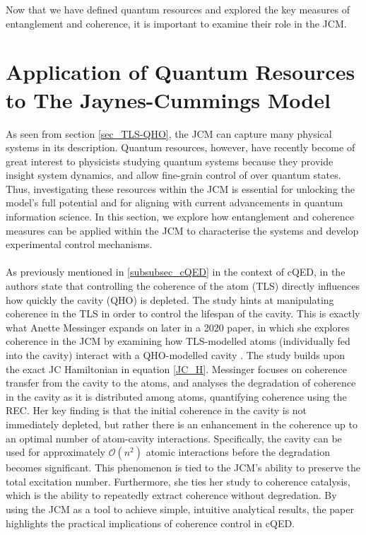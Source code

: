 \documentclass[12pt,a4paper]{article}
\begin{document}
Now that we have defined quantum resources and explored the key measures of entanglement and coherence, it is important to examine their role in the JCM.


\section{Application of Quantum Resources to The Jaynes-Cummings Model} \label{sec_QRes_app}

As seen from section \ref{sec_TLS-QHO}, the JCM can capture many physical systems in its description. Quantum resources, however, have recently become of great interest to physicists studying quantum systems because they provide insight system dynamics, and allow fine-grain control of over quantum states. Thus, investigating these resources within the JCM is essential for unlocking the model's full potential and for aligning with current advancements in quantum information science. In this section, we explore how entanglement and coherence measures can be applied within the JCM to characterise the systems and develop experimental control mechanisms. \\
\\
As previously mentioned in \ref{subsubsec_cQED} in the context of cQED, in \cite{QResJCm2004-cQED_coherence}the authors state that controlling the coherence of the atom (TLS) directly influences how quickly the cavity (QHO) is depleted. The study hints at manipulating coherence in the TLS in order to control the lifespan of the cavity. This is exactly what Anette Messinger expands on later in a 2020 paper, in which she explores coherence in the JCM by examining how TLS-modelled atoms (individually fed into the cavity) interact with a QHO-modelled cavity \cite{CohEnt2020-Cavity_controlled_coherence}. The study builds upon the exact JC Hamiltonian in equation \eqref{JC_H}. Messinger focuses on coherence transfer from the cavity to the atoms, and analyses the degradation of coherence in the cavity as it is distributed among atoms, quantifying coherence using the REC. Her key finding is that the initial coherence in the cavity is not immediately depleted, but rather there is an enhancement in the coherence up to an optimal number of atom-cavity interactions. Specifically, the cavity can be used for approximately $\mathcal{O}(n^2)$ atomic interactions before the degradation becomes significant. This phenomenon is tied to the JCM's ability to preserve the total excitation number. Furthermore, she ties her study to coherence catalysis, which is the ability to repeatedly extract coherence without degredation. By using the JCM as a tool to achieve simple, intuitive analytical results, the paper highlights the practical implications of coherence control in cQED.
\end{document}
